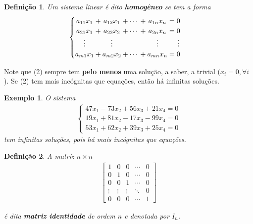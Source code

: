 \documentclass{article}
\newtheorem*{definition}{Definição}
\newtheorem*{example}{Exemplo}
\begin{document}
\begin{definition}
	Um sistema linear é dito \textbf{homogêneo} se tem a forma
	\begin{align}
	\begin{cases}
	\begin{array}{*{9}{@{}c@{}}}
	a_{11}x_1 & {}+{} & a_{12}x_1 &{}+{} & \cdots & {}+{} & a_{1n}x_n & {}\mathrel{=}{} & 0 \\
	a_{21}x_1 & + & a_{22}x_2 & + & \cdots & + & a_{2n}x_n & = & 0 \\
	\vdots    &   & \vdots    &   &        &   & \vdots    &   & \vdots \\
	a_{m1}x_1 & + & a_{m2}x_2 & + & \cdots & + & a_{mn}x_n & = & 0 \\
	\end{array}
	\end{cases}
	\end{align}
\end{definition}
\par\vspace{0.3cm} Note que (2) sempre tem \textbf{pelo menos} uma solução, a saber, a trivial ($x_i = 0, \forall i$). Se (2) tem mais incógnitas que equações, então há infinitas soluções.

\begin{example}
	O sistema
	\begin{align*}
	\begin{cases}
		47x_1 - 73 x_2 + 56x_3 + 21x_4 = 0 \\
		19x_1 + 81x_2 - 17x_3 - 99x_4 = 0 \\
		53x_1 + 62x_2 + 39x_3 + 25x_4 = 0
	\end{cases}	
	\end{align*}
	tem infinitas soluções, pois há mais incógnitas que equações.
\end{example}

\begin{definition}
	A matriz $n\times n$
	\begin{align*}
	\begin{bmatrix}
	1 & 0 & 0 &\cdots & 0 \\
	0 & 1 & 0 &\cdots & 0 \\
	0 & 0 & 1 & \cdots & 0 \\
	\vdots & \vdots & \vdots & \ddots & 0 \\
	0 & 0 & 0 &\cdots & 1 
	\end{bmatrix}
	\end{align*} 
	\par\vspace{0.3cm} é dita \textbf{matriz identidade} de ordem $n$ e denotada por $I_n$.
\end{definition}
\end{document}
